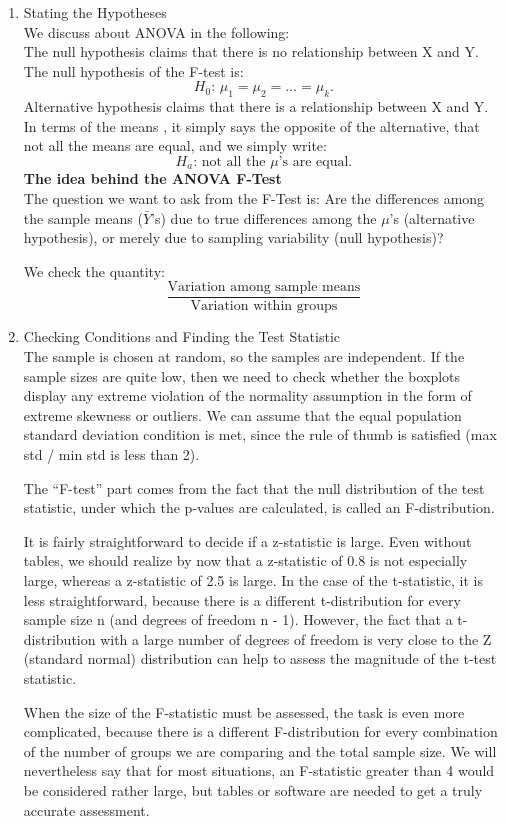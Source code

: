 \documentclass[10pt, a4paper]{article}
\begin{document}
\begin{enumerate}
\item Stating the Hypotheses\\ 
We discuss about ANOVA in the following:\\
The null hypothesis claims that there is no relationship between X and Y. The null hypothesis of the F-test is:\\ 
\[H_0:\, \mu_1=\mu_2=\dots=\mu_k.\]
Alternative hypothesis claims that there is a relationship between X and Y. In terms of the means , it simply says the opposite of the alternative, that not all the means are equal, and we simply write:
\[
    H_a: \, \text{not all the }\mu\text{'s are equal}.
\]
\textbf{The idea behind the ANOVA F-Test}\\
The question we want to ask from the F-Test is: Are the differences among the sample means ($\bar{Y}$'s) due to true differences among the $\mu$'s (alternative hypothesis), or merely due to sampling variability (null hypothesis)?\par 
We check the quantity:
\[
    \frac{\text{Variation among sample means}}{\text{Variation within groups}}
\]
\item Checking Conditions and Finding the Test Statistic\\
The sample is chosen at random, so the samples are independent. If the sample sizes are quite low, then we need to check whether the boxplots display any extreme violation of the normality assumption in the form of extreme skewness or outliers.
We can assume that the equal population standard deviation condition is met, since the rule of thumb is satisfied (max std / min std is less than 2).\par
The ``F-test'' part comes from the fact that the null distribution of the test statistic, under which the p-values are calculated, is called an F-distribution.\par
It is fairly straightforward to decide if a z-statistic is large. Even without tables, we should realize by now that a z-statistic of 0.8 is not especially large, whereas a z-statistic of 2.5 is large. In the case of the t-statistic, it is less straightforward, because there is a different t-distribution for every sample size n (and degrees of freedom n - 1). However, the fact that a t-distribution with a large number of degrees of freedom is very close to the Z (standard normal) distribution can help to assess the magnitude of the t-test statistic.\par
When the size of the F-statistic must be assessed, the task is even more complicated, because there is a different F-distribution for every combination of the number of groups we are comparing and the total sample size. We will nevertheless say that for most situations, an F-statistic greater than 4 would be considered rather large, but tables or software are needed to get a truly accurate assessment.

\end{enumerate}
\end{document}
